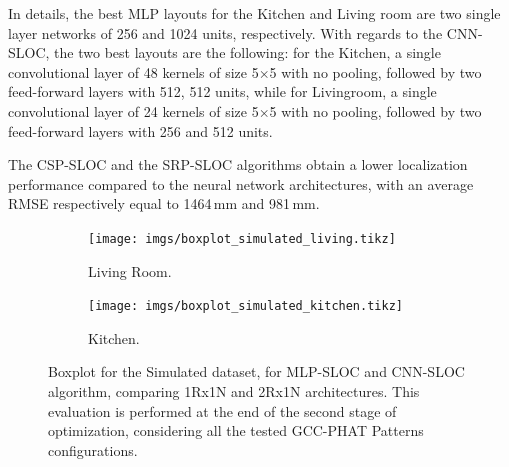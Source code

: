 \documentclass[review]{elsarticle}
\begin{document}
In details, the best MLP layouts for the Kitchen and Living room are two single layer networks of 256 and 1024 units, respectively. %
With regards to the CNN-SLOC, the two best layouts are the following: for the Kitchen, a single convolutional layer of 48 kernels of size 5$\times$5 with no pooling, followed by two feed-forward layers with 512, 512 units, while for Livingroom, a single convolutional layer of 24 kernels of size 5$\times$5 with no pooling, followed by two feed-forward layers with 256 and 512 units.

The CSP-SLOC and the SRP-SLOC algorithms obtain a lower localization performance compared to the neural network architectures, with an average RMSE respectively equal to 1464\,mm and 981\,mm.



\newenvironment{customlegend}[1][]{%
	\begingroup
	\csname pgfplots@init@cleared@structures\endcsname
	\pgfplotsset{#1}%
}{%
\csname pgfplots@createlegend\endcsname
\endgroup
}%

\def\addlegendimage{\csname pgfplots@addlegendimage\endcsname}

\begin{figure}[t]
	\centering
	\begin{subfigure}[t]{0.5\textwidth}

					\texttt{[image: imgs/boxplot\_simulated\_living.tikz]}
	
		\caption{Living Room.}\label{fig:boxplot_simu-living}
 	 \end{subfigure}%
		\begin{subfigure}[t]{0.5\textwidth}
			\centering
					\texttt{[image: imgs/boxplot\_simulated\_kitchen.tikz]}
							\caption{Kitchen.}				\label{fig:boxplot_simu-kitchen}
		\end{subfigure}
		
				\caption{Boxplot for the Simulated dataset, for MLP-SLOC and CNN-SLOC algorithm, comparing 1Rx1N and 2Rx1N architectures. This evaluation is performed at the end of the second stage of optimization, considering all the tested GCC-PHAT Patterns configurations.}
				\label{fig:boxplot_simu-mlp}
	\end{figure}
	
\end{document}
